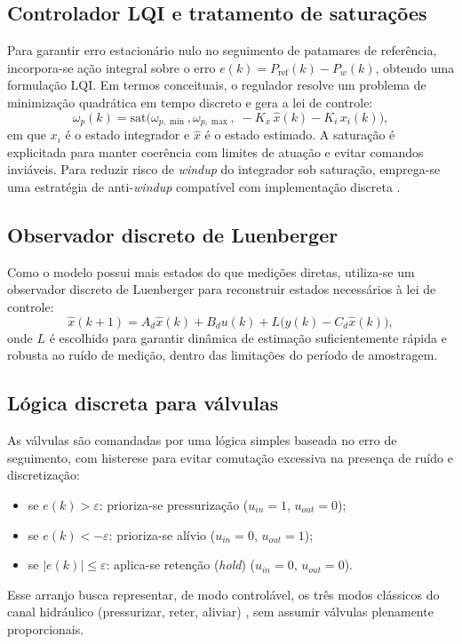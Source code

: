 \documentclass[a4paper]{ifacconf}
\begin{document}
\subsection{Controlador LQI e tratamento de saturações}
Para garantir erro estacionário nulo no seguimento de patamares de referência, incorpora-se ação integral sobre o erro $e(k)=P_{\mathrm{ref}}(k)-P_w(k)$, obtendo uma formulação LQI. Em termos conceituais, o regulador resolve um problema de minimização quadrática em tempo discreto e gera a lei de controle:
\begin{equation}
   \omega_p(k) = \mathrm{sat}\big(\omega_{p,\min},\omega_{p,\max},\; -K_x\,\hat{x}(k)-K_i\,x_i(k)\big),
   \label{eq:lqi_control}
\end{equation}
em que $x_i$ é o estado integrador e $\hat{x}$ é o estado estimado. A saturação é explicitada para manter coerência com limites de atuação e evitar comandos inviáveis. Para reduzir risco de \textit{windup} do integrador sob saturação, emprega-se uma estratégia de anti-\textit{windup} compatível com implementação discreta \cite{FranklinPowellWorkman1998,Ogata1997}.

\subsection{Observador discreto de Luenberger}
Como o modelo possui mais estados do que medições diretas, utiliza-se um observador discreto de Luenberger para reconstruir estados necessários à lei de controle:
\begin{equation}
   \hat{x}(k+1)=A_d\hat{x}(k)+B_d u(k)+L\big(y(k)-C_d\hat{x}(k)\big),
   \label{eq:luenberger}
\end{equation}
onde $L$ é escolhido para garantir dinâmica de estimação suficientemente rápida e robusta ao ruído de medição, dentro das limitações do período de amostragem.

\subsection{Lógica discreta para válvulas}
As válvulas são comandadas por uma lógica simples baseada no erro de seguimento, com histerese para evitar comutação excessiva na presença de ruído e discretização:
\begin{itemize}
   \item se $e(k)>\varepsilon$: prioriza-se pressurização ($u_{in}=1$, $u_{out}=0$);
   \item se $e(k)<-\varepsilon$: prioriza-se alívio ($u_{in}=0$, $u_{out}=1$);
   \item se $|e(k)|\le \varepsilon$: aplica-se retenção (\textit{hold}) ($u_{in}=0$, $u_{out}=0$).
\end{itemize}
Esse arranjo busca representar, de modo controlável, os três modos clássicos do canal hidráulico (pressurizar, reter, aliviar) \cite{Konrad2014}, sem assumir válvulas plenamente proporcionais.
\end{document}
